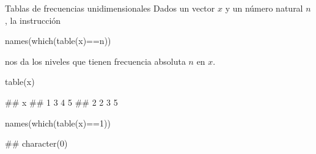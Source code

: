 \documentclass[
  ignorenonframetext,
  aspectratio=169]{beamer}
\newenvironment{Shaded}{\begin{snugshade}}{\end{snugshade}}
\newcommand{\DecValTok}[1]{\textcolor[rgb]{0.00,0.00,0.81}{#1}}
\newcommand{\FunctionTok}[1]{\textcolor[rgb]{0.00,0.00,0.00}{#1}}
\newcommand{\NormalTok}[1]{#1}
\newcommand{\SpecialCharTok}[1]{\textcolor[rgb]{0.00,0.00,0.00}{#1}}
\let\oldverbatim\verbatim
\let\endoldverbatim\endverbatim
\renewenvironment{verbatim}{\tiny\oldverbatim}{\endoldverbatim}
\begin{document}
\begin{frame}[fragile]{Tablas de frecuencias unidimensionales}
\protect\hypertarget{tablas-de-frecuencias-unidimensionales-12}{}
Dados un vector \(x\) y un número natural \(n\), la instrucción

\begin{verbatim}
names(which(table(x)==n))
\end{verbatim}

nos da los niveles que tienen frecuencia absoluta \(n\) en \(x\).

\begin{Shaded}
\begin{Highlighting}[]
\FunctionTok{table}\NormalTok{(x)}
\end{Highlighting}
\end{Shaded}

\begin{verbatim}
## x
## 1 3 4 5 
## 2 2 3 5
\end{verbatim}

\begin{Shaded}
\begin{Highlighting}[]
\FunctionTok{names}\NormalTok{(}\FunctionTok{which}\NormalTok{(}\FunctionTok{table}\NormalTok{(x)}\SpecialCharTok{==}\DecValTok{1}\NormalTok{))}
\end{Highlighting}
\end{Shaded}

\begin{verbatim}
## character(0)
\end{verbatim}
\end{frame}
\end{document}
